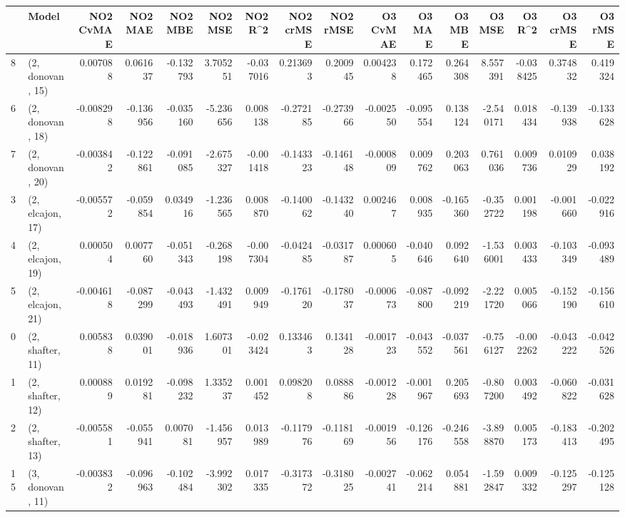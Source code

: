 \begin{tabular}{llrrrrrrrrrrrrrr}
\toprule
{} &             Model &  NO2 CvMAE &   NO2 MAE &   NO2 MBE &    NO2 MSE &   NO2 R\textasciicircum2 &  NO2 crMSE &  NO2 rMSE &  O3 CvMAE &    O3 MAE &    O3 MBE &     O3 MSE &    O3 R\textasciicircum2 &  O3 crMSE &   O3 rMSE \\
\midrule
8  &  (2, donovan, 15) &   0.007088 &  0.061637 & -0.132793 &   3.705251 & -0.037016 &   0.213693 &  0.200945 &  0.004238 &  0.172465 &  0.264308 &   8.557391 & -0.038425 &  0.374832 &  0.419324 \\
6  &  (2, donovan, 18) &  -0.008298 & -0.136956 & -0.035160 &  -5.236656 &  0.008138 &  -0.272185 & -0.273966 & -0.002550 & -0.095554 &  0.138124 &  -2.540171 &  0.018434 & -0.139938 & -0.133628 \\
7  &  (2, donovan, 20) &  -0.003842 & -0.122861 & -0.091085 &  -2.675327 & -0.001418 &  -0.143323 & -0.146148 & -0.000809 &  0.009762 &  0.203063 &   0.761036 &  0.009736 &  0.010929 &  0.038192 \\
3  &  (2, elcajon, 17) &  -0.005572 & -0.059854 &  0.034916 &  -1.236565 &  0.008870 &  -0.140062 & -0.143240 &  0.002467 &  0.008935 & -0.165360 &  -0.352722 &  0.001198 & -0.001660 & -0.022916 \\
4  &  (2, elcajon, 19) &   0.000504 &  0.007760 & -0.051343 &  -0.268198 & -0.007304 &  -0.042485 & -0.031787 &  0.000605 & -0.040646 &  0.092640 &  -1.536001 &  0.003433 & -0.103349 & -0.093489 \\
5  &  (2, elcajon, 21) &  -0.004618 & -0.087299 & -0.043493 &  -1.432491 &  0.009949 &  -0.176120 & -0.178037 & -0.000673 & -0.087800 & -0.092219 &  -2.221720 &  0.005066 & -0.152190 & -0.156610 \\
0  &  (2, shafter, 11) &   0.005838 &  0.039001 & -0.018936 &   1.607301 & -0.023424 &   0.133463 &  0.134128 & -0.001723 & -0.043552 & -0.037561 &  -0.756127 & -0.002262 & -0.043222 & -0.042526 \\
1  &  (2, shafter, 12) &   0.000889 &  0.019281 & -0.098232 &   1.335237 &  0.001452 &   0.098208 &  0.088886 & -0.001228 & -0.001967 &  0.205693 &  -0.807200 &  0.003492 & -0.060822 & -0.031628 \\
2  &  (2, shafter, 13) &  -0.005581 & -0.055941 &  0.007081 &  -1.456957 &  0.013989 &  -0.117976 & -0.118169 & -0.001956 & -0.126176 & -0.246558 &  -3.898870 &  0.005173 & -0.183413 & -0.202495 \\
15 &  (3, donovan, 11) &  -0.003832 & -0.096963 & -0.102484 &  -3.992302 &  0.017335 &  -0.317372 & -0.318025 & -0.002741 & -0.062214 &  0.054881 &  -1.592847 &  0.009332 & -0.125297 & -0.125128 \\

\end{tabular}
